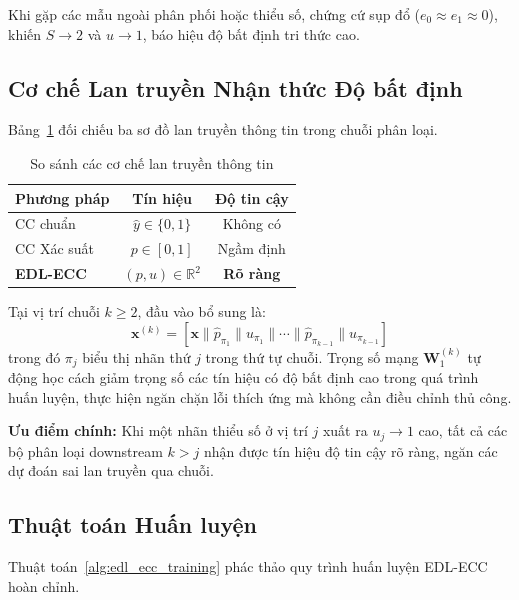 \documentclass[conference]{IEEEtran}
\begin{document}
Khi gặp các mẫu ngoài phân phối hoặc thiểu số, chứng cứ sụp đổ ($e_0 \approx e_1 \approx 0$), khiến $S \to 2$ và $u \to 1$, báo hiệu độ bất định tri thức cao.

\subsection{Cơ chế Lan truyền Nhận thức Độ bất định}

Bảng~\ref{tab:propagation_comparison} đối chiếu ba sơ đồ lan truyền thông tin trong chuỗi phân loại.

\begin{table}[t]
\centering
\caption{So sánh các cơ chế lan truyền thông tin}
\label{tab:propagation_comparison}
\small
\begin{tabular}{lcc}
\toprule
\textbf{Phương pháp} & \textbf{Tín hiệu} & \textbf{Độ tin cậy} \\ 
\midrule
CC chuẩn & $\hat{y} \in \{0,1\}$ & Không có \\
CC Xác suất & $p \in [0,1]$ & Ngầm định \\
\textbf{EDL-ECC} & $(p, u) \in \mathbb{R}^2$ & \textbf{Rõ ràng} \\ 
\bottomrule
\end{tabular}
\end{table}

Tại vị trí chuỗi $k \geq 2$, đầu vào bổ sung là:
\begin{equation}
    \mathbf{x}^{(k)} = [\mathbf{x} \| \hat{p}_{\pi_1} \| u_{\pi_1} \| \cdots \| \hat{p}_{\pi_{k-1}} \| u_{\pi_{k-1}}]
    \label{eq:feature_augmentation}
\end{equation}
trong đó $\pi_j$ biểu thị nhãn thứ $j$ trong thứ tự chuỗi. Trọng số mạng $\mathbf{W}_1^{(k)}$ tự động học cách giảm trọng số các tín hiệu có độ bất định cao trong quá trình huấn luyện, thực hiện ngăn chặn lỗi thích ứng mà không cần điều chỉnh thủ công.

\textbf{Ưu điểm chính:} Khi một nhãn thiểu số ở vị trí $j$ xuất ra $u_j \to 1$ cao, tất cả các bộ phân loại downstream $k > j$ nhận được tín hiệu độ tin cậy rõ ràng, ngăn các dự đoán sai lan truyền qua chuỗi.

\subsection{Thuật toán Huấn luyện}

Thuật toán~\ref{alg:edl_ecc_training} phác thảo quy trình huấn luyện EDL-ECC hoàn chỉnh.
\end{document}
